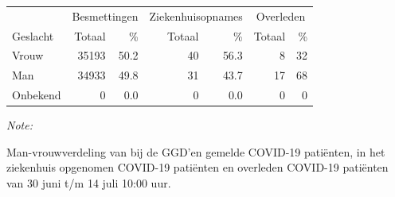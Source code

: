 \documentclass[
  english,
  man,floatsintext]{apa6}
\begin{document}
\begin{table}
\centering\begingroup\fontsize{11}{13}\selectfont

\begin{threeparttable}
\begin{tabular}{lrrrrrr}
\toprule
\multicolumn{1}{c}{ } & \multicolumn{2}{c}{Besmettingen} & \multicolumn{2}{c}{Ziekenhuisopnames} & \multicolumn{2}{c}{Overleden} \\
\cmidrule(l{3pt}r{3pt}){2-3} \cmidrule(l{3pt}r{3pt}){4-5} \cmidrule(l{3pt}r{3pt}){6-7}
Geslacht & Totaal & \% & Totaal & \% & Totaal & \%\\
\midrule
Vrouw & 35193 & 50.2 & 40 & 56.3 & 8 & 32\\
Man & 34933 & 49.8 & 31 & 43.7 & 17 & 68\\
Onbekend & 0 & 0.0 & 0 & 0.0 & 0 & 0\\
\bottomrule
\end{tabular}
\begin{tablenotes}
\item \textit{Note: } 
\item Man-vrouwverdeling van bij de GGD’en gemelde COVID-19 patiënten, in het ziekenhuis opgenomen COVID-19 patiënten en overleden COVID-19 patiënten van 30 juni t/m 14 juli 10:00 uur.
\end{tablenotes}
\end{threeparttable}
\endgroup{}
\end{table}
\newpage
\end{document}
